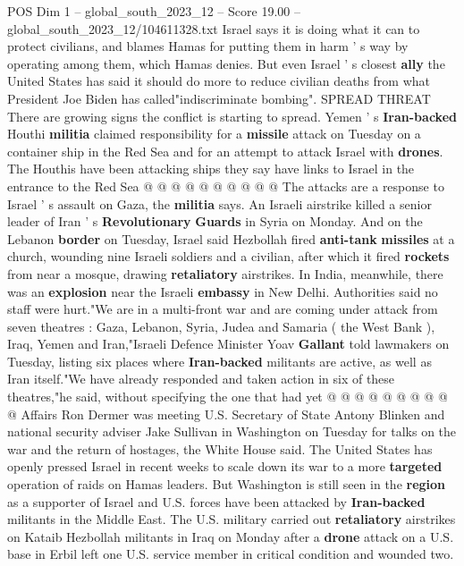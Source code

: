 \begin{textsample}{POS Dim 1 – global\_south\_2023\_12 – Score 19.00 – global\_south\_2023\_12/104611328.txt}
Israel says it is doing what it can to protect civilians, and blames Hamas for putting them in harm ' s way by operating among them, which Hamas denies.
But even Israel ' s closest \textbf{ally} the United States has said it should do more to reduce civilian deaths from what President Joe Biden has called"indiscriminate bombing".
SPREAD THREAT There are growing signs the conflict is starting to spread.
Yemen ' s \textbf{Iran-backed} Houthi \textbf{militia} claimed responsibility for a \textbf{missile} attack on Tuesday on a container ship in the Red Sea and for an attempt to attack Israel with \textbf{drones}.
The Houthis have been attacking ships they say have links to Israel in the entrance to the Red Sea @ @ @ @ @ @ @ @ @ @ The attacks are a response to Israel ' s assault on Gaza, the \textbf{militia} says.
An Israeli airstrike killed a senior leader of Iran ' s \textbf{Revolutionary} \textbf{Guards} in Syria on Monday.
And on the Lebanon \textbf{border} on Tuesday, Israel said Hezbollah fired \textbf{anti-tank} \textbf{missiles} at a church, wounding nine Israeli soldiers and a civilian, after which it fired \textbf{rockets} from near a mosque, drawing \textbf{retaliatory} airstrikes.
In India, meanwhile, there was an \textbf{explosion} near the Israeli \textbf{embassy} in New Delhi.
Authorities said no staff were hurt."We are in a multi-front war and are coming under attack from seven theatres : Gaza, Lebanon, Syria, Judea and Samaria ( the West Bank ), Iraq, Yemen and Iran,"Israeli Defence Minister Yoav \textbf{Gallant} told lawmakers on Tuesday, listing six places where \textbf{Iran-backed} militants are active, as well as Iran itself."We have already responded and taken action in six of these theatres,"he said, without specifying the one that had yet @ @ @ @ @ @ @ @ @ @ Affairs Ron Dermer was meeting U.S.
Secretary of State Antony Blinken and national security adviser Jake Sullivan in Washington on Tuesday for talks on the war and the return of hostages, the White House said.
The United States has openly pressed Israel in recent weeks to scale down its war to a more \textbf{targeted} operation of raids on Hamas leaders.
But Washington is still seen in the \textbf{region} as a supporter of Israel and U.S. forces have been attacked by \textbf{Iran-backed} militants in the Middle East.
The U.S. military carried out \textbf{retaliatory} airstrikes on Kataib Hezbollah militants in Iraq on Monday after a \textbf{drone} attack on a U.S. base in Erbil left one U.S. service member in critical condition and wounded two.

\end{textsample}
